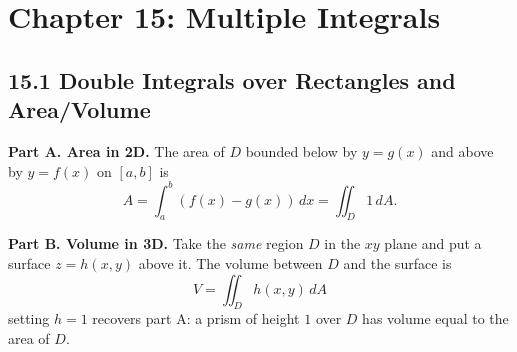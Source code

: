 \documentclass[12pt]{article}
\theoremstyle{compact}
\begin{document}
\newpage
\section{Chapter 15: Multiple Integrals}

\subsection{15.1 Double Integrals over Rectangles and Area/Volume}

\textbf{Part A. Area in 2D.} The area of $D$ bounded below by $y=g(x)$ and above by $y=f(x)$ on $[a,b]$ is
\[
A = \int_a^b (f(x)-g(x))\,dx = \iint_D 1\,dA.
\]

\begin{center}
\end{center}

\textbf{Part B. Volume in 3D.} Take the \emph{same} region $D$ in the $xy$ plane and put a surface $z=h(x,y)$ above it. The volume between $D$ and the surface is
\[
V = \iint_D h(x,y)\,dA
\]
setting $h=1$ recovers part A: a prism of height $1$ over $D$ has volume equal to the area of $D$.
\end{document}
